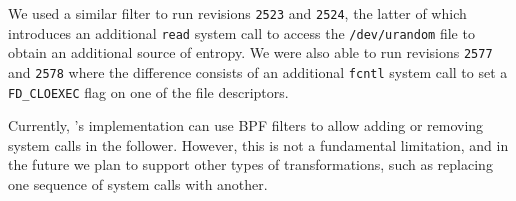 

We used a similar filter to run revisions \lstinline`2523` and
\lstinline`2524`, the latter of which introduces an additional
\lstinline`read` system call to access the \lstinline`/dev/urandom`
file to obtain an additional source of entropy.  We were also able to
run revisions \lstinline`2577` and \lstinline`2578` where the
difference consists of an additional \lstinline`fcntl` system call to
set a \lstinline`FD_CLOEXEC` flag on one of the file descriptors.

Currently, \varan's implementation can use BPF filters to allow adding
or removing system calls in the follower.  However, this is not a
fundamental limitation, and in the future we plan
to support  other types of transformations, such as replacing one
sequence of system calls with another.





